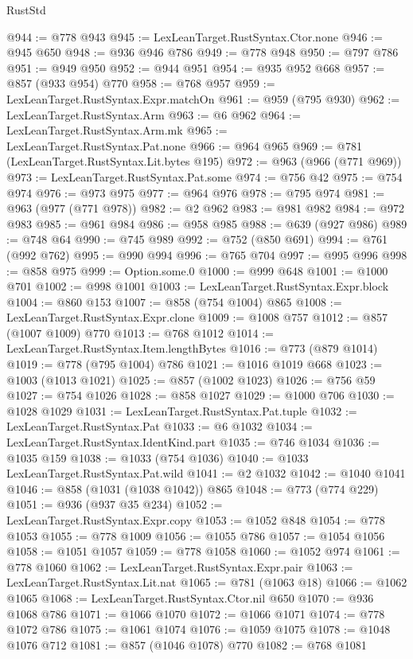 \begin{lexlean}{RustStd}
\begin{coremodule}
@944 := @778 @943
@945 := LexLeanTarget.RustSyntax.Ctor.none
@946 := @945 @650
@948 := @936 @946 @786
@949 := @778 @948
@950 := @797 @786
@951 := @949 @950
@952 := @944 @951
@954 := @935 @952 @668
@957 := @857 (@933 @954) @770
@958 := @768 @957
@959 := LexLeanTarget.RustSyntax.Expr.matchOn
@961 := @959 (@795 @930)
@962 := LexLeanTarget.RustSyntax.Arm
@963 := @6 @962
@964 := LexLeanTarget.RustSyntax.Arm.mk
@965 := LexLeanTarget.RustSyntax.Pat.none
@966 := @964 @965
@969 := @781 (LexLeanTarget.RustSyntax.Lit.bytes @195)
@972 := @963 (@966 (@771 @969))
@973 := LexLeanTarget.RustSyntax.Pat.some
@974 := @756 @42
@975 := @754 @974
@976 := @973 @975
@977 := @964 @976
@978 := @795 @974
@981 := @963 (@977 (@771 @978))
@982 := @2 @962
@983 := @981 @982
@984 := @972 @983
@985 := @961 @984
@986 := @958 @985
@988 := @639 (@927 @986)
@989 := @748 @64
@990 := @745 @989
@992 := @752 (@850 @691)
@994 := @761 (@992 @762)
@995 := @990 @994
@996 := @765 @704
@997 := @995 @996
@998 := @858 @975
@999 := Option.some.{0}
@1000 := @999 @648
@1001 := @1000 @701
@1002 := @998 @1001
@1003 := LexLeanTarget.RustSyntax.Expr.block
@1004 := @860 @153
@1007 := @858 (@754 @1004) @865
@1008 := LexLeanTarget.RustSyntax.Expr.clone
@1009 := @1008 @757
@1012 := @857 (@1007 @1009) @770
@1013 := @768 @1012
@1014 := LexLeanTarget.RustSyntax.Item.lengthBytes
@1016 := @773 (@879 @1014)
@1019 := @778 (@795 @1004) @786
@1021 := @1016 @1019 @668
@1023 := @1003 (@1013 @1021)
@1025 := @857 (@1002 @1023)
@1026 := @756 @59
@1027 := @754 @1026
@1028 := @858 @1027
@1029 := @1000 @706
@1030 := @1028 @1029
@1031 := LexLeanTarget.RustSyntax.Pat.tuple
@1032 := LexLeanTarget.RustSyntax.Pat
@1033 := @6 @1032
@1034 := LexLeanTarget.RustSyntax.IdentKind.part
@1035 := @746 @1034
@1036 := @1035 @159
@1038 := @1033 (@754 @1036)
@1040 := @1033 LexLeanTarget.RustSyntax.Pat.wild
@1041 := @2 @1032
@1042 := @1040 @1041
@1046 := @858 (@1031 (@1038 @1042)) @865
@1048 := @773 (@774 @229)
@1051 := @936 (@937 @35 @234)
@1052 := LexLeanTarget.RustSyntax.Expr.copy
@1053 := @1052 @848
@1054 := @778 @1053
@1055 := @778 @1009
@1056 := @1055 @786
@1057 := @1054 @1056
@1058 := @1051 @1057
@1059 := @778 @1058
@1060 := @1052 @974
@1061 := @778 @1060
@1062 := LexLeanTarget.RustSyntax.Expr.pair
@1063 := LexLeanTarget.RustSyntax.Lit.nat
@1065 := @781 (@1063 @18)
@1066 := @1062 @1065
@1068 := LexLeanTarget.RustSyntax.Ctor.nil @650
@1070 := @936 @1068 @786
@1071 := @1066 @1070
@1072 := @1066 @1071
@1074 := @778 @1072 @786
@1075 := @1061 @1074
@1076 := @1059 @1075
@1078 := @1048 @1076 @712
@1081 := @857 (@1046 @1078) @770
@1082 := @768 @1081

\end{coremodule}
\end{lexlean}
